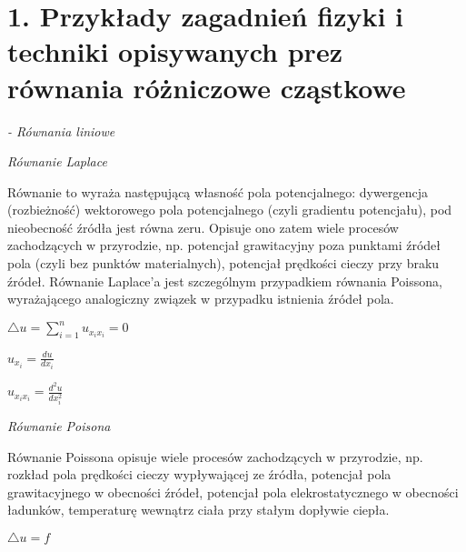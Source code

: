 \section{1. Przykłady zagadnień fizyki i techniki opisywanych prez równania różniczowe cząstkowe}


\textit{- Równania liniowe}


\textit{Równanie Laplace}


Równanie to wyraża następującą własność pola potencjalnego: dywergencja (rozbieżność) wektorowego pola potencjalnego (czyli gradientu potencjału), pod nieobecność źródła jest równa zeru. Opisuje ono zatem wiele procesów zachodzących w przyrodzie, np. potencjał grawitacyjny poza punktami źródeł pola (czyli bez punktów materialnych), potencjał prędkości cieczy przy braku źródeł. Równanie Laplace’a jest szczególnym przypadkiem równania Poissona, wyrażającego analogiczny związek w przypadku istnienia źródeł pola.


$ \bigtriangleup u = \sum_{i=1}^{n} u_{x_ix_i} =0$

$ u_{x_i} = \frac{du}{dx_i}$

$ u_{x_i x_i} = \frac{d^2u}{dx_i^2}$

\textit{Równanie Poisona}



Równanie Poissona opisuje wiele procesów zachodzących w przyrodzie, np. rozkład pola prędkości cieczy wypływającej ze źródła, potencjał pola grawitacyjnego w obecności źródeł, potencjał pola elekrostatycznego w obecności ładunków, temperaturę wewnątrz ciała przy stałym dopływie ciepła.

$ \bigtriangleup u =f$